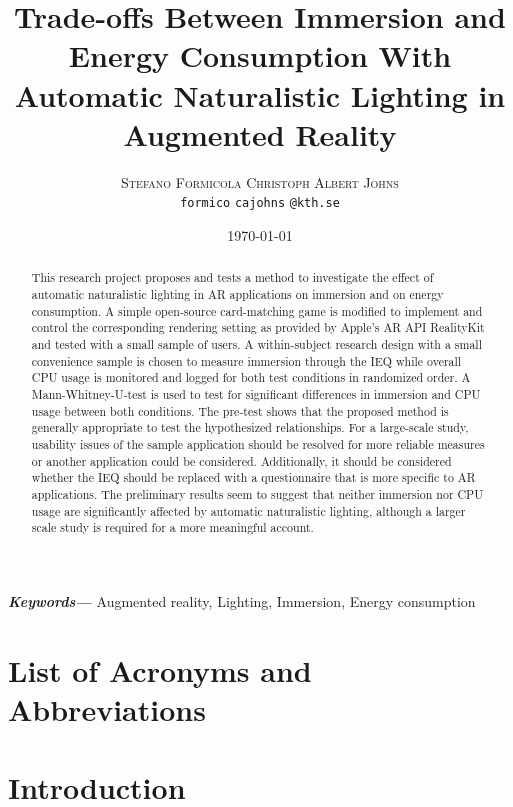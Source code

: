 \documentclass[12pt,twoside,english]{article}
\title{Trade-offs Between Immersion and Energy Consumption With Automatic Naturalistic Lighting in Augmented Reality}
\author{
        \textsc{Stefano Formicola}
            \qquad
        \textsc{Christoph Albert Johns}
        \mbox{}\\
        \normalsize
            \texttt{formico}
        \textbar{}
            \texttt{cajohns}
        \normalsize
            \texttt{@kth.se}
}
\date{\today}
\providecommand{\keywords}[1]
{
  \small	
  \textbf{\textit{Keywords---}} #1
}
\begin{document}
\maketitle


\begin{abstract}
\label{sec:abstract}

This research project proposes and tests a method to investigate the effect of automatic naturalistic lighting in \gls{AR} applications on immersion and on energy consumption.
A simple open-source card-matching game is modified to implement and control the corresponding rendering setting as provided by Apple's \gls{AR} \gls{API} RealityKit and tested with a small sample of users.
A within-subject research design with a small convenience sample is chosen to measure immersion through the \gls{IEQ} while overall \gls{CPU} usage is monitored and logged for both test conditions in randomized order.
A Mann-Whitney-U-test is used to test for significant differences in immersion and \gls{CPU} usage between both conditions.
The pre-test shows that the proposed method is generally appropriate to test the hypothesized relationships.
For a large-scale study, usability issues of the sample application should be resolved for more reliable measures or another application could be considered.
Additionally, it should be considered whether the \gls{IEQ} should be replaced with a questionnaire that is more specific to \gls{AR} applications.
The preliminary results seem to suggest that neither immersion nor \gls{CPU} usage are significantly affected by automatic naturalistic lighting, although a larger scale study is required for a more meaningful account.

\end{abstract}

\keywords{Augmented reality, Lighting, Immersion, Energy consumption}
\clearpage

\tableofcontents

\section*{List of Acronyms and Abbreviations}
\label{list-of-acronyms-and-abbreviations}
\renewcommand{\glossarysection}[2][]{} %
\printglossary[type=\acronymtype, nonumberlist]

\clearpage
\section{Introduction}
\label{sect:introduction}
\end{document}
